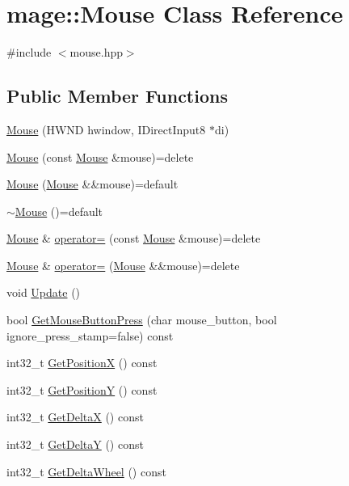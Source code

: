 \hypertarget{classmage_1_1_mouse}{}\section{mage\+:\+:Mouse Class Reference}
\label{classmage_1_1_mouse}


{\ttfamily \#include $<$mouse.\+hpp$>$}

\subsection*{Public Member Functions}
\begin{DoxyCompactItemize}
\item 
\hyperlink{classmage_1_1_mouse_ad02365977dab44603400ac6f24e0df97}{Mouse} (H\+W\+ND hwindow, I\+Direct\+Input8 $\ast$di)
\item 
\hyperlink{classmage_1_1_mouse_af11aa23e6cfbefb4cd3d90b17c63db7c}{Mouse} (const \hyperlink{classmage_1_1_mouse}{Mouse} \&mouse)=delete
\item 
\hyperlink{classmage_1_1_mouse_a7f3cf710c9e588379ffdcaa044fb3cb3}{Mouse} (\hyperlink{classmage_1_1_mouse}{Mouse} \&\&mouse)=default
\item 
\hyperlink{classmage_1_1_mouse_a29ed64ff53304fdb5c336264d702a4cf}{$\sim$\+Mouse} ()=default
\item 
\hyperlink{classmage_1_1_mouse}{Mouse} \& \hyperlink{classmage_1_1_mouse_a585119f1b0db3fbc7436c86676518c8c}{operator=} (const \hyperlink{classmage_1_1_mouse}{Mouse} \&mouse)=delete
\item 
\hyperlink{classmage_1_1_mouse}{Mouse} \& \hyperlink{classmage_1_1_mouse_a42d80f535a12356762a506438036dd71}{operator=} (\hyperlink{classmage_1_1_mouse}{Mouse} \&\&mouse)=delete
\item 
void \hyperlink{classmage_1_1_mouse_a0cddae3f871dd69c1ba6928dc6b1f985}{Update} ()
\item 
bool \hyperlink{classmage_1_1_mouse_a9c8d4493c86685b259819b5995a17c7a}{Get\+Mouse\+Button\+Press} (char mouse\+\_\+button, bool ignore\+\_\+press\+\_\+stamp=false) const
\item 
int32\+\_\+t \hyperlink{classmage_1_1_mouse_af2c2e3a3b7f5f0ccab8b31d5f820c1fc}{Get\+PositionX} () const
\item 
int32\+\_\+t \hyperlink{classmage_1_1_mouse_ac158bf873174eb91be523b56439fb06c}{Get\+PositionY} () const
\item 
int32\+\_\+t \hyperlink{classmage_1_1_mouse_a4268857c537895bd1aea144120254fa4}{Get\+DeltaX} () const
\item 
int32\+\_\+t \hyperlink{classmage_1_1_mouse_a43acf31458088ae2d779fecdac2be0c6}{Get\+DeltaY} () const
\item 
int32\+\_\+t \hyperlink{classmage_1_1_mouse_a241a67628ecb123f86fee484fd910807}{Get\+Delta\+Wheel} () const
\end{DoxyCompactItemize}
